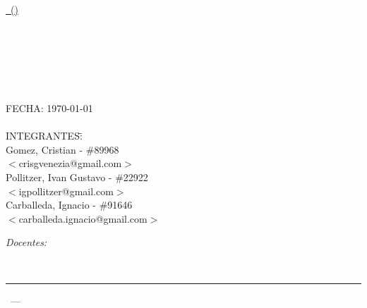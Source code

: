 \begin{titlepage}
\begin{center}
\end{center}

\vfill

\begin{center}
\underline{\Large{\nombreMateria\, (\codigoMateria)}}
\end{center}

\vfill
\begin{center}

\end{center}
\vfill

\begin{center}
\Huge{\textsc{ \tituloTP }}\\[.5cm]
	\begin{figure}[H]
		\centering
	\end{figure}\HRule \\[0.1cm]
\Huge{\textbf{\descripcionTP}}\\[0.01cm]
\HRule\\[0.3cm]
\end{center}

\vfill



\begin{tabbing}
	FECHA: \today\\
\\
	INTEGRANTES:\hspace{-1cm}\=\+\hspace{1cm}\=\hspace{6cm}\=\\
		Gomez, Cristian	\>\>- \#89968\\
			\>\footnotesize{$<$crisgvenezia@gmail.com$>$}\\
		Pollitzer, Ivan Gustavo	\>\>- \#22922\\
			\>\footnotesize{$<$igpollitzer@gmail.com$>$}\\
		Carballeda, Ignacio	\>\>- \#91646\\
			\>\footnotesize{$<$carballeda.ignacio@gmail.com$>$}\\

\end{tabbing}

\begin{flushleft} \large
\emph{Docentes:}\\[.2cm]
\end{flushleft}
\begin{tabbing}
\docentes\\[.5cm]
\end{tabbing}

\vfill

\hrule
\vspace{0.2cm}

\noindent\small{\codigoMateria\, --- \nombreMateria \hfill \facultad}

\end{titlepage}
